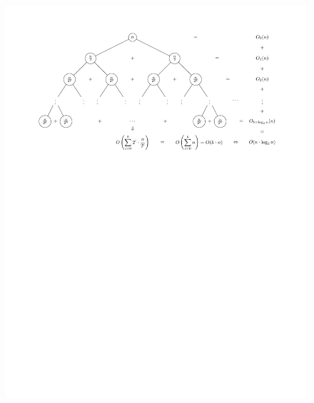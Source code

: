 \begin{solution}
    \begin{figure}[H]
        \centering
        \includegraphics[scale=0.8]{figures/bTree.pdf}
        \caption{}
    \end{figure}
\end{solution}
